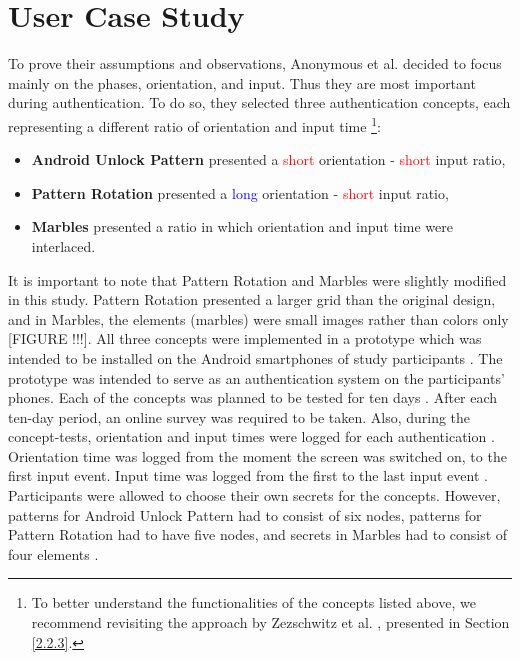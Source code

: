 \section{User Case Study}

To prove their assumptions and observations, Anonymous et al. \cite{anonymous} decided to focus mainly on the phases, orientation, and input. Thus they are most important during authentication. To do so, they selected three authentication concepts, each representing a different ratio of orientation and input time \cite{anonymous}
\footnote{To better understand the functionalities of the concepts listed above, we recommend revisiting the approach by Zezschwitz et al. \cite{Marbles}, presented in Section \ref{2.2.3}.}: 

\begin{itemize}
    \item \textbf{Android Unlock Pattern} presented a \textcolor{red}{short} orientation - \textcolor{red}{short} input ratio,
    \item \textbf{Pattern Rotation} presented a \textcolor{blue}{long} orientation - \textcolor{red}{short} input ratio,
    \item \textbf{Marbles} presented a ratio in which orientation and input time were interlaced.
\end{itemize}

It is important to note that Pattern Rotation and Marbles were slightly modified in this study. Pattern Rotation presented a larger grid than the original design, and in Marbles, the elements (marbles) were small images rather than colors only [FIGURE !!!]. All three concepts were implemented in a prototype which was intended to be installed on the Android smartphones of study participants \cite{anonymous}. The prototype was intended to serve as an authentication system on the participants' phones. Each of the concepts was planned to be tested for ten days \cite{anonymous}. After each ten-day period, an online survey was required to be taken. Also, during the concept-tests, orientation and input times were logged for each authentication \cite{anonymous}. Orientation time was logged from the moment the screen was switched on, to the first input event. Input time was logged from the first to the last input event \cite{anonymous}. Participants were allowed to choose their own secrets for the concepts. However, patterns for Android Unlock Pattern had to consist of six nodes, patterns for Pattern Rotation had to have five nodes, and secrets in Marbles had to consist of four elements \cite{anonymous}.

